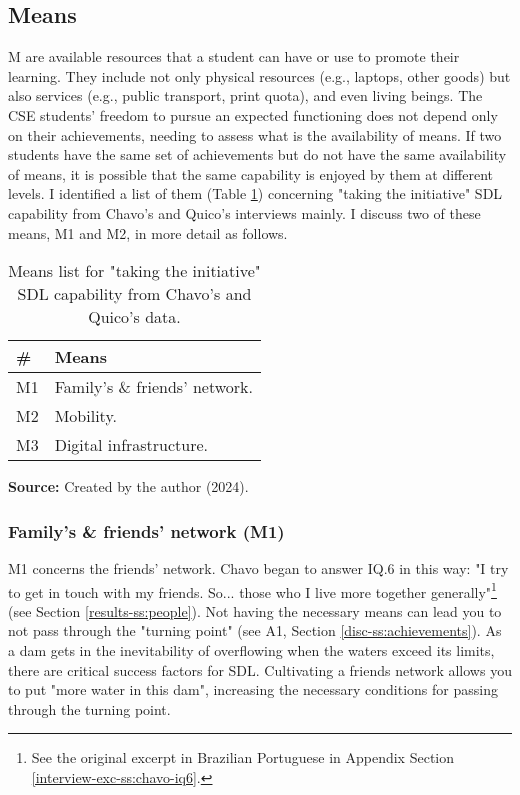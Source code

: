 \subsection{Means}
\label{disc-ss:means}

\gls{M} are available resources that a student can have or use to promote their learning. They include not only physical resources (e.g., laptops, other goods) but also services (e.g., public transport, print quota), and even living beings. The \gls{CSE} students' freedom to pursue an expected functioning does not depend only on their achievements, needing to assess what is the availability of means. If two students have the same set of achievements but do not have the same availability of means, it is possible that the same capability is enjoyed by them at different levels. I identified a list of them (Table \ref{tbl:means-list}) concerning "taking the initiative" \gls{SDL} capability from Chavo's and Quico's interviews mainly. I discuss two of these means, \gls{M}1 and \gls{M}2, in more detail as follows.

\begin{table}[ht]
\caption{Means list for "taking the initiative" \acrshort{SDL} capability from Chavo's and Quico's data.}
\label{tbl:means-list}
\centering
{}
\begin{tabular}{p{0.5cm}p{5cm}}
\hline
\textbf{\#} &
\textbf{Means}\\
\hline     
M1 &
Family's \& friends' network.\\
M2 &
Mobility. \\
M3 & 
Digital infrastructure. \\
\hline

\end{tabular}
\par\medskip\ABNTEXfontereduzida\selectfont\textbf{Source:} Created by the author (2024). \par\medskip
\end{table}

\subsubsection{Family’s \& friends’ network (M1)}

\gls{M}1 concerns the friends' network. Chavo began to answer \gls{IQ}.6 in this way: "I try to get in touch with my friends. So... those who I live more together generally"\footnote{See the original excerpt in Brazilian Portuguese in Appendix Section \ref{interview-exc-ss:chavo-iq6}.} (see Section \ref{results-ss:people}). Not having the necessary means can lead you to not pass through the "turning point" (see \gls{A}1, Section \ref{disc-ss:achievements}). As a dam gets in the inevitability of overflowing when the waters exceed its limits, there are critical success factors for \gls{SDL}. Cultivating a friends network allows you to put "more water in this dam", increasing the necessary conditions for passing through the turning point.

